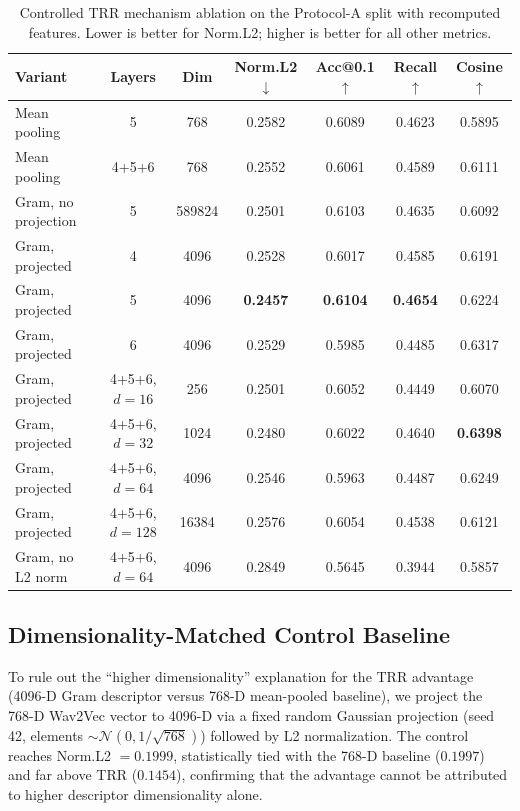 \documentclass[journal,10pt]{IEEEtran}
\begin{document}
\begin{table}[t]
	\centering
	\caption{Controlled TRR mechanism ablation on the Protocol-A split with recomputed features. Lower is better for Norm.L2; higher is better for all other metrics.}
	\label{tab:trr_mechanism_ablation}
	\footnotesize
	\begin{tabular}{lcccccc}
		\toprule
		\textbf{Variant} & \textbf{Layers} & \textbf{Dim} & \textbf{Norm.L2} $\downarrow$ & \textbf{Acc@0.1} $\uparrow$ & \textbf{Recall} $\uparrow$ & \textbf{Cosine} $\uparrow$ \\
		\midrule
		Mean pooling & 5 & 768 & 0.2582 & 0.6089 & 0.4623 & 0.5895 \\
		Mean pooling & 4+5+6 & 768 & 0.2552 & 0.6061 & 0.4589 & 0.6111 \\
		Gram, no projection & 5 & 589824 & 0.2501 & 0.6103 & 0.4635 & 0.6092 \\
		Gram, projected & 4 & 4096 & 0.2528 & 0.6017 & 0.4585 & 0.6191 \\
		Gram, projected & 5 & 4096 & \textbf{0.2457} & \textbf{0.6104} & \textbf{0.4654} & 0.6224 \\
		Gram, projected & 6 & 4096 & 0.2529 & 0.5985 & 0.4485 & 0.6317 \\
		Gram, projected & 4+5+6, $d=16$ & 256 & 0.2501 & 0.6052 & 0.4449 & 0.6070 \\
		Gram, projected & 4+5+6, $d=32$ & 1024 & 0.2480 & 0.6022 & 0.4640 & \textbf{0.6398} \\
		Gram, projected & 4+5+6, $d=64$ & 4096 & 0.2546 & 0.5963 & 0.4487 & 0.6249 \\
		Gram, projected & 4+5+6, $d=128$ & 16384 & 0.2576 & 0.6054 & 0.4538 & 0.6121 \\
		Gram, no L2 norm & 4+5+6, $d=64$ & 4096 & 0.2849 & 0.5645 & 0.3944 & 0.5857 \\
		\bottomrule
	\end{tabular}
\end{table}

\subsection{Dimensionality-Matched Control Baseline}

To rule out the ``higher dimensionality'' explanation for the TRR advantage (4096-D Gram descriptor versus 768-D mean-pooled baseline), we project the 768-D Wav2Vec vector to 4096-D via a fixed random Gaussian projection (seed 42, elements $\sim \mathcal{N}(0, 1/\sqrt{768})$) followed by L2 normalization. The control reaches Norm.L2 $=0.1999$, statistically tied with the 768-D baseline ($0.1997$) and far above TRR ($0.1454$), confirming that the advantage cannot be attributed to higher descriptor dimensionality alone.
\end{document}
